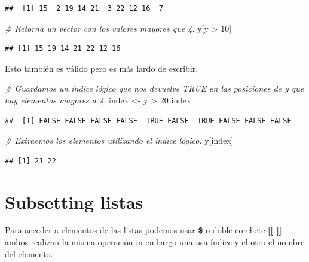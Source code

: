 \documentclass[
  12pt,
]{book}
\newenvironment{Shaded}{\begin{snugshade}}{\end{snugshade}}
\newcommand{\CommentTok}[1]{\textcolor[rgb]{0.56,0.35,0.01}{\textit{#1}}}
\newcommand{\DecValTok}[1]{\textcolor[rgb]{0.00,0.00,0.81}{#1}}
\newcommand{\NormalTok}[1]{#1}
\newcommand{\OtherTok}[1]{\textcolor[rgb]{0.56,0.35,0.01}{#1}}
\newcommand{\SpecialCharTok}[1]{\textcolor[rgb]{0.00,0.00,0.00}{#1}}
\begin{document}
\begin{verbatim}
##  [1] 15  2 19 14 21  3 22 12 16  7
\end{verbatim}

\begin{Shaded}
\begin{Highlighting}[]
\CommentTok{\# Retorna un vector con los valores mayores que 4.}
\NormalTok{y[y }\SpecialCharTok{\textgreater{}} \DecValTok{10}\NormalTok{]}
\end{Highlighting}
\end{Shaded}

\begin{verbatim}
## [1] 15 19 14 21 22 12 16
\end{verbatim}

Esto también es válido pero es más lardo de escribir.

\begin{Shaded}
\begin{Highlighting}[]
\CommentTok{\# Guardamos un índice lógico que nos devuelve TRUE en las posiciones de y que hay elementos mayores a 4.}
\NormalTok{index }\OtherTok{\textless{}{-}}\NormalTok{ y }\SpecialCharTok{\textgreater{}} \DecValTok{20}
\NormalTok{index}
\end{Highlighting}
\end{Shaded}

\begin{verbatim}
##  [1] FALSE FALSE FALSE FALSE  TRUE FALSE  TRUE FALSE FALSE FALSE
\end{verbatim}

\begin{Shaded}
\begin{Highlighting}[]
\CommentTok{\# Extraemos los elementos utilizando el índice lógico.}
\NormalTok{y[index]}
\end{Highlighting}
\end{Shaded}

\begin{verbatim}
## [1] 21 22
\end{verbatim}

\hypertarget{subsetting-listas}{%
\section{\texorpdfstring{\textbf{Subsetting listas}}{Subsetting listas}}\label{subsetting-listas}}

Para acceder a elementos de las listas podemos usar \textbf{\$} o doble corchete \textbf{{[}{[} {]}{]}}, ambos realizan la misma operación in embargo una usa índice y el otro el nombre del elemento.
\end{document}
